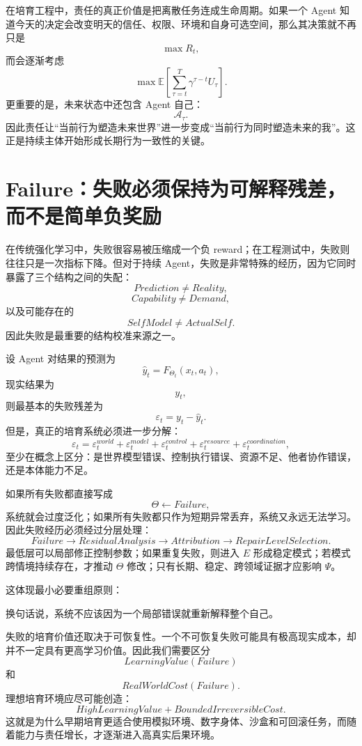 在培育工程中，责任的真正价值是把离散任务连成生命周期。如果一个 Agent 知道今天的决定会改变明天的信任、权限、环境和自身可选空间，那么其决策就不再只是
\[
\max R_t,
\]
而会逐渐考虑
\[
\max
\mathbb E
\left[
\sum_{\tau=t}^{T}
\gamma^{\tau-t}
U_\tau
\right].
\]
更重要的是，未来状态中还包含 Agent 自己：
\[
\mathcal A_{\tau}.
\]
因此责任让“当前行为塑造未来世界”进一步变成“当前行为同时塑造未来的我”。这正是持续主体开始形成长期行为一致性的关键。

\section{Failure：失败必须保持为可解释残差，而不是简单负奖励}

在传统强化学习中，失败很容易被压缩成一个负 reward；在工程测试中，失败则往往只是一次指标下降。但对于持续 Agent，失败是非常特殊的经历，因为它同时暴露了三个结构之间的失配：
\[
\boxed{
Prediction
\neq
Reality,
}
\]
\[
\boxed{
Capability
\neq
Demand,
}
\]
以及可能存在的
\[
\boxed{
SelfModel
\neq
ActualSelf.
}
\]
因此失败是最重要的结构校准来源之一。

设 Agent 对结果的预测为
\[
\hat y_t
=
F_{\Theta_t}
(x_t,a_t),
\]
现实结果为
\[
y_t,
\]
则最基本的失败残差为
\[
\varepsilon_t
=
y_t-\hat y_t.
\]
但是，真正的培育系统必须进一步分解：
\[
\varepsilon_t
=
\varepsilon_t^{world}
+
\varepsilon_t^{model}
+
\varepsilon_t^{control}
+
\varepsilon_t^{resource}
+
\varepsilon_t^{coordination},
\]
至少在概念上区分：是世界模型错误、控制执行错误、资源不足、他者协作错误，还是本体能力不足。

如果所有失败都直接写成
\[
\Theta\leftarrow Failure,
\]
系统就会过度泛化；如果所有失败都只作为短期异常丢弃，系统又永远无法学习。因此失败经历必须经过分层处理：
\[
Failure
\rightarrow
ResidualAnalysis
\rightarrow
Attribution
\rightarrow
RepairLevelSelection.
\]
最低层可以局部修正控制参数；如果重复失败，则进入 $E$ 形成稳定模式；若模式跨情境持续存在，才推动 $\Theta$ 修改；只有长期、稳定、跨领域证据才应影响 $\Psi$。

这体现最小必要重组原则：
\begin{statementbox}
\centering
{}
\end{statementbox}
换句话说，系统不应该因为一个局部错误就重新解释整个自己。

失败的培育价值还取决于可恢复性。一个不可恢复失败可能具有极高现实成本，却并不一定具有更高学习价值。因此我们需要区分
\[
LearningValue(Failure)
\]
和
\[
RealWorldCost(Failure).
\]
理想培育环境应尽可能创造：
\[
\boxed{
HighLearningValue
+
BoundedIrreversibleCost.
}
\]
这就是为什么早期培育更适合使用模拟环境、数字身体、沙盒和可回滚任务，而随着能力与责任增长，才逐渐进入高真实后果环境。

